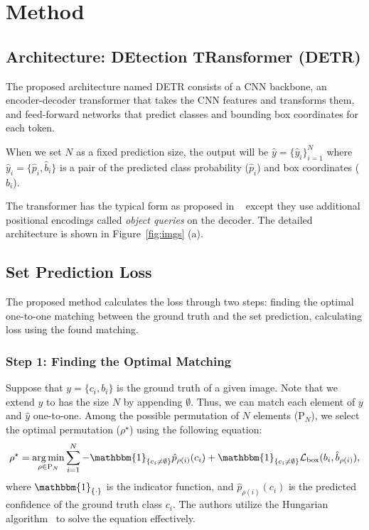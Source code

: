 \documentclass[10pt,twocolumn,letterpaper]{article}
\DeclareMathOperator*{\argmin}{arg\,min}
\newcommand{\Rho}{\mathrm{P}}
\newcommand{\indic}[1]{\mathbbm{1}_{\{#1\}}}
\newcommand{\bloss}[1]{{\cal L}_{\rm box}(#1)}
\begin{document}
\section{Method}
\subsection{Architecture: DEtection TRansformer (DETR)}
The proposed architecture named DETR consists of a CNN backbone, an encoder-decoder transformer that takes the CNN features and transforms them, and feed-forward networks that predict classes and bounding box coordinates for each token. 

When we set $N$ as a fixed prediction size, the output will be  $\hat{y} = \{\hat{y}_i\}_{i=1}^{N}$ where $\hat{y}_i = \{\hat{p}_i, \hat{b}_i\}$ is a pair of the predicted class probability ($\hat{p}_i$) and box coordinates ($\hat{b}_i$). 

The transformer has the typical form as proposed in ~\cite{SA} except they use additional positional encodings called \textit{object queries} on the decoder. The detailed architecture is shown in Figure~\ref{fig:imgs} (a). 

\subsection{Set Prediction Loss}
The proposed method calculates the loss through two steps: finding the optimal one-to-one matching between the ground truth and the set prediction, calculating loss using the found matching.

\subsubsection{Step 1: Finding the Optimal Matching}
Suppose that $y = \{c_i, b_i\}$ is the ground truth of a given image. Note that we extend $y$ to has the size $N$ by appending $\emptyset$. Thus, we can match each element of $y$ and $\hat{y}$ one-to-one. Among the possible permutation of $N$ elements ($\Rho_N$), we select the optimal permutation ($\rho^{\star}$) using the following equation:
\begin{align*}
	\rho^{\star} = \argmin_{\rho\in\Rho_N} \sum_{i=1}^{N} -\indic{c_i\neq\emptyset}\hat{p}_{\rho(i)}(c_i) + \indic{c_i\neq\emptyset} \bloss{b_{i}, \hat{b}_{\rho(i)}},
\end{align*}
where $\indic{\cdot}$ is the indicator function, and $\hat{p}_{\rho(i)}(c_i)$ is the predicted confidence of the ground truth class $c_i$. The authors utilize the Hungarian algorithm~\cite{Hung} to solve the equation effectively.
\end{document}
